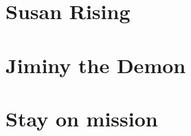 \documentclass[12pt,twoside,onecolumn,openright,extrafontsizes]{memoir}
\begin{document}
\clearpage
\tableofcontents*

\mainmatter
\chapter{Susan Rising}

\chapter{Jiminy the Demon}

\chapter{Stay on mission}


\end{document}
